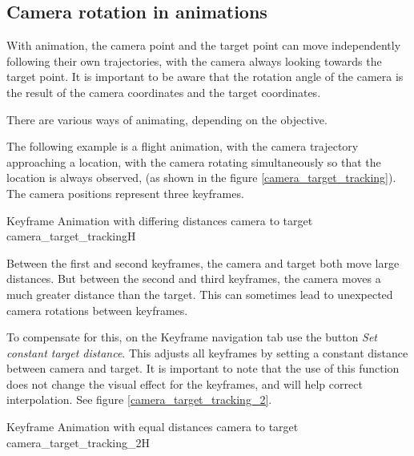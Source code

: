 \subsection{Camera rotation in animations}\label{camera-rotation-in-animations}

With animation, the camera point and the target point can move independently
following their own trajectories, with the camera always looking towards the
target point. It is important to be aware that the rotation angle of the camera
is the result of the camera coordinates and the target coordinates.

There are various ways of animating, depending on the objective.

The following example is a flight animation, with the camera trajectory
approaching a location, with the camera rotating simultaneously so that the
location is always observed, (as shown in the figure \ref{camera_target_tracking}). The camera
positions represent three keyframes.

{Keyframe Animation with differing distances camera to target}
{camera_target_tracking}{H}

Between the first and second keyframes, the camera and target both move large
distances. But between the second and third keyframes, the camera moves a much
greater distance than the target. This can sometimes lead to unexpected camera
rotations between keyframes.

To compensate for this, on the Keyframe navigation tab use the button \emph{Set constant target distance}. This adjusts all keyframes by
setting a constant distance between camera and target. It is important to note
that the use of this function does not change the visual effect for the
keyframes, and will help correct interpolation. See figure \ref{camera_target_tracking_2}.

{Keyframe Animation with equal distances camera to target}
{camera_target_tracking_2}{H}
